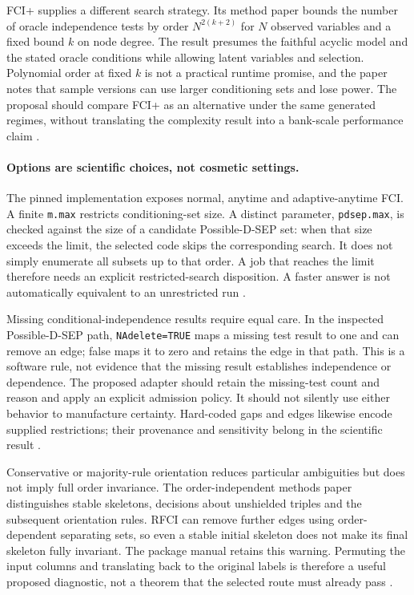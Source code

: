 FCI+ supplies a different search strategy. Its method paper bounds the
number of oracle independence tests by order $N^{2(k+2)}$ for $N$ observed
variables and a fixed bound $k$ on node degree. The result presumes the
faithful acyclic model and the stated oracle conditions while allowing
latent variables and selection. Polynomial order at fixed $k$ is not a
practical runtime promise, and the paper notes that sample versions can
use larger conditioning sets and lose power. The proposal should compare
FCI+ as an alternative under the same generated regimes, without translating
the complexity result into a bank-scale performance claim
\citep{exec13_latentr_claassen2013}.

\paragraph{Options are scientific choices, not cosmetic settings.}
The pinned implementation exposes normal, anytime and adaptive-anytime
FCI. A finite \texttt{m.max} restricts conditioning-set size. A distinct
parameter, \texttt{pdsep.max}, is checked against the size of a candidate
Possible-D-SEP set: when that size exceeds the limit, the selected code skips
the corresponding search. It does not simply enumerate all subsets up to
that order. A job that reaches the limit therefore needs an explicit
restricted-search disposition. A faster answer is not automatically
equivalent to an unrestricted run
\citep{exec13_latentr_primary}.

Missing conditional-independence results require equal care. In the inspected
Possible-D-SEP path, \texttt{NAdelete=TRUE} maps a missing test result to
one and can remove an edge; false maps it to zero and retains the edge in
that path. This is a software rule, not evidence that the missing result
establishes independence or dependence. The proposed adapter should retain
the missing-test count and reason and apply an explicit admission policy.
It should not silently use either behavior to manufacture certainty.
Hard-coded gaps and edges likewise encode supplied restrictions; their
provenance and sensitivity belong in the scientific result
\citep{exec13_latentr_primary}.

Conservative or majority-rule orientation reduces particular ambiguities
but does not imply full order invariance. The order-independent methods
paper distinguishes stable skeletons, decisions about unshielded triples
and the subsequent orientation rules. RFCI can remove further edges using
order-dependent separating sets, so even a stable initial skeleton does not
make its final skeleton fully invariant. The package manual retains this
warning. Permuting the input columns and translating back to the original
labels is therefore a useful proposed diagnostic, not a theorem that the
selected route must already pass
\citep{exec13_latentr_colombo2014,exec13_latentr_primary}.

